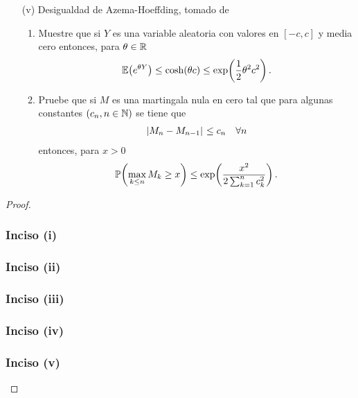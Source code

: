 \begin{problema}
\begin{enumerate}
		\item[(v)]
			Desigualdad de Azema-Hoeffding, tomado de \cite[E14.2, p.237]{MR1155402}
			\begin{enumerate}
				\item Muestre que si $Y$ es una variable aleatoria con valores en $[-c,c]$ y media cero entonces, para $\theta\in\mathbb{R}$
						\begin{align}
							\mathbb{E}\! \left( e^{\theta Y} \right)\leq\cosh\!\left( \theta c\right) \leq \exp\!\left( \frac{1}{2}\theta^2c^2\right) . 
						\end{align}
				\item Pruebe que si $M$ es una martingala nula en cero tal que para algunas constantes $\left( c_n,n\in\mathbb{N}\right) $ se tiene que
						\begin{align}
							\hspace{.25mm}\left|M_n-M_{n-1}\right|\hspace{.25mm}\leq c_n\quad\forall n
						\end{align}
						entonces, para $x>0$
						\begin{align}
							\mathbb{P}\! \left( \max_{k\leq n} M_k\geq x \right)\leq \exp\!\left( \frac{x^2}{2\sum_{k=1}^n c_k^2}\right) .
						\end{align}
			\end{enumerate}
	\end{enumerate}
\end{problema}

\begin{proof}
	\subsubsection{Inciso (i)} 
	
	\newpage
	
	\subsubsection{Inciso (ii)} 
	
	\newpage
		
	\subsubsection{Inciso (iii)} \label{problema2_3:inciso3}
	
	\newpage
	
	\subsubsection{Inciso (iv)} 
	
	\newpage
	
	\subsubsection{Inciso (v)}
	
\end{proof}